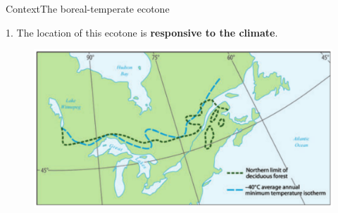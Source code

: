 \documentclass[10pt,aspectratio=149]{beamer}
\begin{document}



\begin{frame}{Context}{The boreal-temperate ecotone}

1. The location of this ecotone is \textbf{responsive to the climate}.

\begin{figure}
	\includegraphics[width=.70\paperwidth]{Figs/climecotone.png}
\end{figure}

\end{frame}

\end{document}
